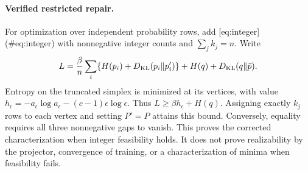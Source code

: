 \documentclass[10pt]{article}
\begin{document}
\paragraph*{Verified restricted repair.}\mbox{}\par
For optimization over independent probability rows, add [eq:integer] (\#eq:integer) with nonnegative integer counts and \(\sum_j k_j=n\). Write \[L=\frac{\beta}{n}\sum_i\{H(p_i)+D_{\rm KL}(p_i\|p_i')\}
       +H(q)+D_{\rm KL}(q\|\bar p).\] Entropy on the truncated simplex is minimized at its vertices, with value \(h_\epsilon=-a_\epsilon\log a_\epsilon-(c-1)\epsilon\log\epsilon\). Thus \(L\geq\beta h_\epsilon+H(q)\). Assigning exactly \(k_j\) rows to each vertex and setting \(P'=P\) attains this bound. Conversely, equality requires all three nonnegative gaps to vanish. This proves the corrected characterization when integer feasibility holds. It does not prove realizability by the projector, convergence of training, or a characterization of minima when feasibility fails.\par
\end{document}
